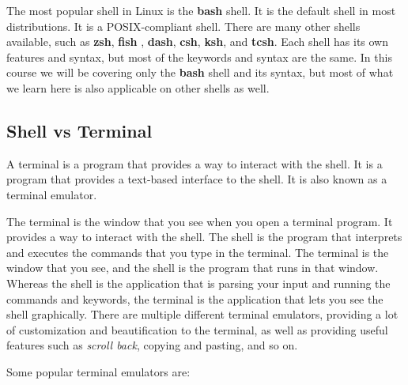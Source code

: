 The most popular shell in Linux is the \textbf{bash} shell. It is the default shell in most distributions. It is a POSIX-compliant
 shell.
There are many other shells available, such as \textbf{zsh}, \textbf{fish}
, \textbf{dash}, \textbf{csh}, \textbf{ksh}, and \textbf{tcsh}. Each shell has its own features and syntax, but most of the keywords and syntax are the same. In this course we will be covering only the \textbf{bash} shell and its syntax, but most of what we learn here is also applicable on other shells as well.

\subsection{Shell vs Terminal}

\begin{definition}[Terminal]
  A terminal is a program that provides a way to interact with the shell. It is a program that provides a text-based interface to the shell. It is also known as a terminal emulator.
\end{definition}

The terminal is the window that you see when you open a terminal program. It provides a way to interact with the shell. The shell is the program that interprets and executes the commands that you type in the terminal. The terminal is the window that you see, and the shell is the program that runs in that window. Whereas the shell is the application that is parsing your input and running the commands and keywords, the terminal is the application that lets you see the shell graphically. There are multiple different terminal emulators, providing a lot of customization and beautification to the terminal, as well as providing useful features such as \textit{scroll back}, copying and pasting, and so on.

Some popular terminal emulators are:

